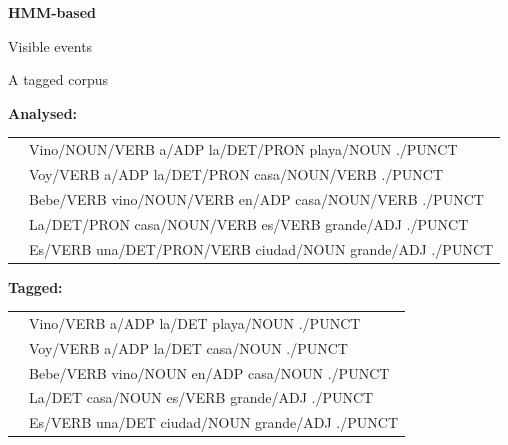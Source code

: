 \documentclass{beamer}
\begin{document}

\begin{frame}
\centering
{\LARGE {\bf HMM-based } }
\end{frame}

\begin{frame}


\end{frame}



\begin{frame}{Visible events}


\end{frame}


\begin{frame}{A tagged corpus}

\textbf{Analysed:} \\
\begin{tabular}{ll}
& Vino/NOUN/VERB a/ADP la/DET/PRON playa/NOUN ./PUNCT \\
& Voy/VERB a/ADP la/DET/PRON casa/NOUN/VERB ./PUNCT \\
& Bebe/VERB vino/NOUN/VERB en/ADP casa/NOUN/VERB ./PUNCT \\
& La/DET/PRON casa/NOUN/VERB es/VERB grande/ADJ ./PUNCT \\
& Es/VERB una/DET/PRON/VERB ciudad/NOUN grande/ADJ ./PUNCT \\
\end{tabular} 

\textbf{Tagged:} \\
\begin{tabular}{ll}
& Vino/VERB a/ADP la/DET playa/NOUN ./PUNCT \\
& Voy/VERB a/ADP la/DET casa/NOUN ./PUNCT \\
& Bebe/VERB vino/NOUN en/ADP casa/NOUN ./PUNCT \\
& La/DET casa/NOUN es/VERB grande/ADJ ./PUNCT \\
& Es/VERB una/DET ciudad/NOUN grande/ADJ ./PUNCT \\
\end{tabular}

\end{frame}
\end{document}
